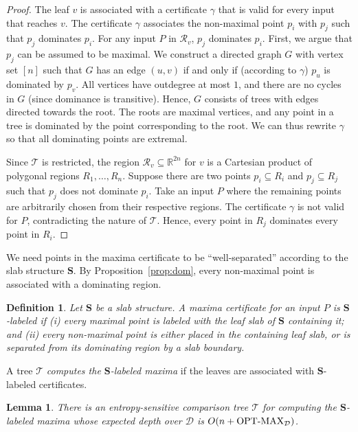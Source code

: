 \documentclass[letterpaper,11pt]{article}
\newtheorem{lemma}[theorem]{Lemma}
\newtheorem{definition}[theorem]{Definition}
\newcommand{\R}{\mathbb{R}}
\newcommand{\OPTMAX}{\text{OPT-MAX}}
\newcommand{\bS}{\textbf{S}}
\newcommand{\cD}{\mathcal{D}}
\newcommand{\cR}{\mathcal{R}}
\newcommand{\cT}{\mathcal{T}}
\begin{document}
\begin{proof} 
The leaf $v$ is associated with a 
certificate $\gamma$ that is valid 
for every input that reaches $v$. 
The certificate $\gamma$ associates 
the non-maximal point $p_i$ with 
$p_j$ such that $p_j$ dominates $p_i$. 
For any input $P$ in $\cR_v$, $p_j$ 
dominates $p_i$. First, we argue 
that $p_j$ can be assumed to be 
maximal. We construct a directed graph 
$G$ with vertex set $[n]$
such that $G$ has an edge $(u,v)$ 
if and only if (according to 
$\gamma$) $p_u$ is dominated by 
$p_v$. All vertices have outdegree at most 
$1$, and there are no cycles in $G$ 
(since dominance is transitive).
Hence, $G$ consists of trees with 
edges directed towards the root.
The roots are maximal vertices, and any 
point in a tree is dominated by the point 
corresponding to the root. We can thus
rewrite $\gamma$ so that all dominating 
points are extremal.

Since $\cT$ is restricted, the 
region $\cR_v \subseteq \R^{2n}$ 
for $v$ is a Cartesian product 
of polygonal regions $R_1, \dots, R_n$.
Suppose there are two points
$p_i \subseteq R_i$ and $p_j \subseteq R_j$
such that $p_j$ does not dominate $p_i$. 
Take an input $P$ where the
remaining points are arbitrarily chosen from their 
respective regions. The certificate $\gamma$
is not valid for $P$, contradicting the 
nature of $\cT$.
Hence, every point in $R_j$ dominates every point 
in $R_i$. 
\end{proof}

We need points 
in the maxima certificate to be 
``well-separated'' according to 
the slab structure $\bS$. 
By Proposition~\ref{prop:dom},
every non-maximal point is associated with a dominating
region.

\begin{definition}\label{def:s-label}
  Let $\bS$ be a slab structure. 
  A maxima certificate for an input $P$ is 
  \emph{$\bS$-labeled} if (i)
  every maximal point is labeled with 
  the leaf slab of $\bS$ containing it; and
  (ii) every non-maximal point is either 
  placed in the containing leaf slab,
  or is separated from its dominating 
  region by a slab boundary.
\end{definition}

A tree $\cT$ \emph{computes the $\bS$-labeled
maxima} if the leaves are associated with 
$\bS$-labeled certificates.

\begin{lemma}\label{lem:comp} 
  There is an entropy-sensitive comparison 
  tree $\cT$ for computing the $\bS$-labeled 
  maxima whose expected depth over $\cD$ is 
  $O(n + \textup{\OPTMAX}_\cD)$.
\end{lemma}
\end{document}
